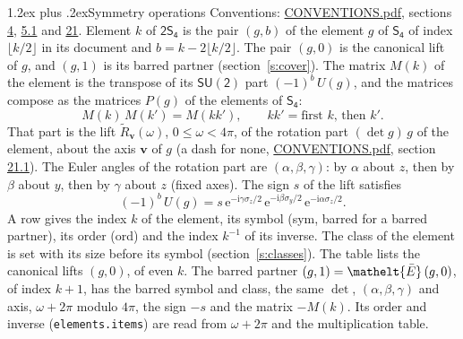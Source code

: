\documentclass[10pt,a4paper]{article}
\makeatletter
\renewcommand\section{\@startsection{section}{1}{\z@}{-3ex plus -1ex minus -.2ex}%
  {1.2ex plus .2ex}{\normalfont\large\sffamily\bfseries\color{parttitle}}}
\numberwithin{equation}{section}
\newcommand{\eltfont}[1]{{\let\sigma\eltsigma\mathelt{#1}}}
\newcommand{\grp}[1]{\mathsf{#1}}
\newcommand{\elt}[1]{\eltfont{#1}}
\newcommand{\vv}{\mathbf{v}}
\newcommand{\iunit}{\mathrm{i}}
\newcommand{\expe}{\mathrm{e}}
\newcommand{\barred}[1]{\bar{#1}}
\newcommand{\lift}[1]{\tilde{#1}}
\newcommand{\pauli}[1]{\sigma_{#1}}
\makeatother
\begin{document}
\section{Symmetry operations}\label{s:elements}
Conventions: \href{../../CONVENTIONS.pdf}{CONVENTIONS.pdf}, sections \href{../../../rotation/CONVENTIONS.pdf\#conv.4}{4}, \href{../../../rotation/CONVENTIONS.pdf\#conv.5.1}{5.1} and \href{../../CONVENTIONS.pdf\#conv.21}{21}.
\leavevmode\label{n:index.element}\label{n:element.g}Element $k$ of $\grp{2S_{4}}$ is the pair $(g, b)$ of the element $g$ of \href{../../../rotation/data/pdf/S4.pdf}{$\grp{S_{4}}$} of index $\lfloor k/2\rfloor$ in its document and $b = k - 2\lfloor k/2\rfloor$. The pair $(g, 0)$ is the canonical lift of $g$, and $(g, 1)$ is its barred partner (section~\ref{s:cover}). \label{n:matrix.element.pin}\label{n:matrix.element}The matrix $M(k)$ of the element is the transpose of its $\grp{SU(2)}$ part $(-1)^{b}\,U(g)$, and the matrices compose as the matrices $P(g)$ of the elements of $\grp{S_{4}}$:
\begin{equation}\label{e:mprod}M(k)\,M(k') = M(kk'),\qquad kk' = \text{first } k\text{, then } k'.\end{equation}
\leavevmode\label{n:angle.omega}\label{n:vector.axis}\label{n:vector.pole}That part is the lift $\lift{R}_{\vv}(\omega)$, $0 \le \omega < 4\pi$, of the rotation part $(\det g)\,g$ of the element, about the axis $\vv$ of $g$ (a dash for none, \href{../../CONVENTIONS.pdf}{CONVENTIONS.pdf}, section \href{../../CONVENTIONS.pdf\#conv.21.1}{21.1}). \label{n:angle.euler.alpha}\label{n:angle.euler.beta}\label{n:angle.euler.gamma}\label{n:vector.coordinates}The Euler angles of the rotation part are $(\alpha,\beta,\gamma)$: by $\alpha$ about $z$, then by $\beta$ about $y$, then by $\gamma$ about $z$ (fixed axes). \label{n:local.euler.sign}The sign $s$ of the lift satisfies
\begin{equation}\label{e:euler}(-1)^{b}\,U(g) = s\,\expe^{-\iunit\gamma\pauli{z}/2}\,\expe^{-\iunit\beta\pauli{y}/2}\,\expe^{-\iunit\alpha\pauli{z}/2}.\end{equation}
\leavevmode\label{n:index.element.inverse}\label{n:head.sym}\label{n:head.ord}A row gives the index $k$ of the element, its symbol (sym, barred for a barred partner), its order (ord) and the index $k^{-1}$ of its inverse. \label{n:head.class}The class of the element is set with its size before its symbol (section~\ref{s:classes}).
The table lists the canonical lifts $(g, 0)$, of even $k$. The barred partner $(g, 1) = \elt{\barred{E}}\,(g, 0)$, of index $k + 1$, has the barred symbol and class, the same $\det$, $(\alpha,\beta,\gamma)$ and axis, $\omega + 2\pi$ modulo $4\pi$, the sign $-s$ and the matrix $-M(k)$. Its order and inverse (\texttt{elements.items}) are read from $\omega + 2\pi$ and the multiplication table.
\end{document}
